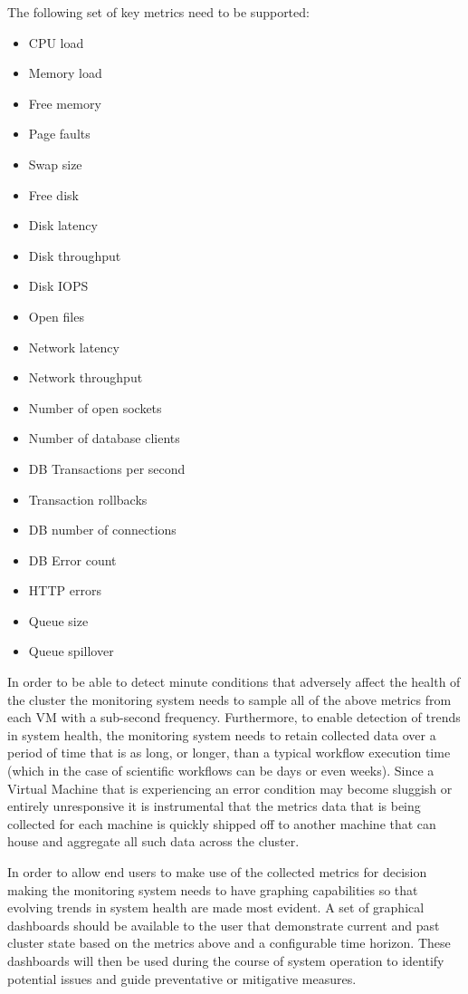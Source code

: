 The following set of key metrics need to be supported:

\begin{multicols}{2}
\begin{itemize}
\item CPU load
\item Memory load
\item Free memory
\item Page faults
\item Swap size
\item Free disk
\item Disk latency
\item Disk throughput
\item Disk IOPS
\item Open files
\item Network latency
\item Network throughput
\item Number of open sockets
\item Number of database clients
\item DB Transactions per second
\item Transaction rollbacks
\item DB number of connections
\item DB Error count
\item HTTP errors
\item Queue size
\item Queue spillover
\end{itemize}
\end{multicols}

In order to be able to detect minute conditions that adversely affect the health of the cluster the monitoring system needs to sample all of the above metrics from each VM with a sub-second frequency. Furthermore, to enable detection of trends in system health, the monitoring system needs to retain collected data over a period of time that is as long, or longer, than a typical workflow execution time (which in the case of scientific workflows can be days or even weeks). Since a Virtual Machine that is experiencing an error condition may become sluggish or entirely unresponsive it is instrumental that the metrics data that is being collected for each machine is quickly shipped off to another machine that can house and aggregate all such data across the cluster. 

In order to allow end users to make use of the collected metrics for decision making the monitoring system needs to have graphing capabilities so that evolving trends in system health are made most evident. A set of graphical dashboards should be available to the user that demonstrate current and past cluster state based on the metrics above and a configurable time horizon. These dashboards will then be used during the course of system operation to identify potential issues and guide preventative or mitigative measures.

